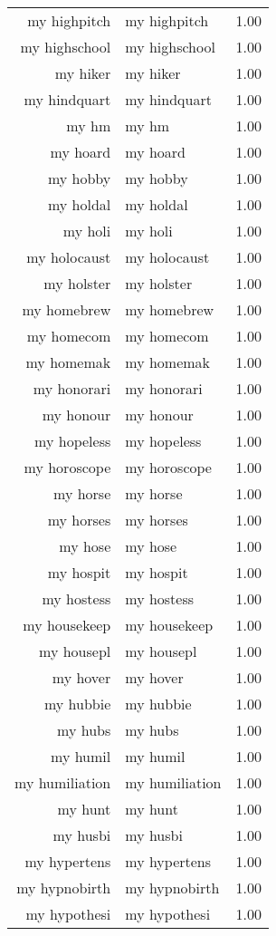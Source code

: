 \begin{table}[ht]
\begin{tabular}{rlr}
  my highpitch & my highpitch & 1.00 \\ 
  my highschool & my highschool & 1.00 \\ 
  my hiker & my hiker & 1.00 \\ 
  my hindquart & my hindquart & 1.00 \\ 
  my hm & my hm & 1.00 \\ 
  my hoard & my hoard & 1.00 \\ 
  my hobby & my hobby & 1.00 \\ 
  my holdal & my holdal & 1.00 \\ 
  my holi & my holi & 1.00 \\ 
  my holocaust & my holocaust & 1.00 \\ 
  my holster & my holster & 1.00 \\ 
  my homebrew & my homebrew & 1.00 \\ 
  my homecom & my homecom & 1.00 \\ 
  my homemak & my homemak & 1.00 \\ 
  my honorari & my honorari & 1.00 \\ 
  my honour & my honour & 1.00 \\ 
  my hopeless & my hopeless & 1.00 \\ 
  my horoscope & my horoscope & 1.00 \\ 
  my horse & my horse & 1.00 \\ 
  my horses & my horses & 1.00 \\ 
  my hose & my hose & 1.00 \\ 
  my hospit & my hospit & 1.00 \\ 
  my hostess & my hostess & 1.00 \\ 
  my housekeep & my housekeep & 1.00 \\ 
  my housepl & my housepl & 1.00 \\ 
  my hover & my hover & 1.00 \\ 
  my hubbie & my hubbie & 1.00 \\ 
  my hubs & my hubs & 1.00 \\ 
  my humil & my humil & 1.00 \\ 
  my humiliation & my humiliation & 1.00 \\ 
  my hunt & my hunt & 1.00 \\ 
  my husbi & my husbi & 1.00 \\ 
  my hypertens & my hypertens & 1.00 \\ 
  my hypnobirth & my hypnobirth & 1.00 \\ 
  my hypothesi & my hypothesi & 1.00 \\ 

\end{tabular}
\end{table}
